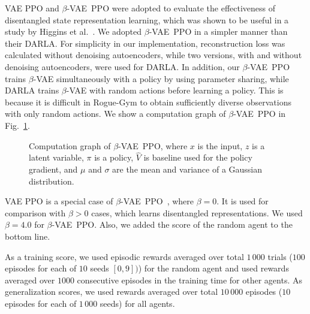 \documentclass[conference]{IEEEtran}
\newcommand\hig{Higgins et al.~\cite{DARLA}}
\newcommand\bvae{$\beta$-VAE}
\newcommand\bppo{\bvae~PPO}
\begin{document}
VAE PPO and \bppo{} were adopted to evaluate the effectiveness of
disentangled state representation learning, which was shown to be useful
in a study by \hig{}.
We adopted \bppo{} in a simpler manner than their DARLA. 
For simplicity in our implementation, reconstruction loss was calculated
without denoising autoencoders, while two versions, with and without
denoising autoencoders, were used for DARLA.
In addition, our \bppo{} trains \bvae{} simultaneously with a
policy by using parameter sharing, while DARLA trains \bvae{} with
random actions before learning a policy.
This is because it is difficult in Rogue-Gym to obtain sufficiently
diverse observations with only random actions.
We show a computation graph of \bppo{} in Fig.~\ref{proposed-graph}.
\begin{figure}[t]
 \centering
 \caption{Computation graph of \bppo{}, where $x$ is the input, $z$ is a
 latent variable, $\pi$ is a policy, $\hat{V}$ is baseline used for the
 policy gradient, and $\mu$ and $\sigma$ are the mean and variance of a
 Gaussian distribution.} \label{proposed-graph}
\end{figure}

VAE PPO is a special case of \bppo{}~\cite{betaVAE}, where $\beta=0$.
It is used for comparison with $\beta > 0$ cases, which learns
disentangled representations.
We used $\beta = 4.0$ for \bppo{}.
Also, we added the score of the random agent to the bottom line.

As a training score, we used episodic rewards averaged over total
$1\,000$ trials ($100$ episodes for each of $10$ seeds $[0, 9])$) for the
random agent and used rewards averaged over $1000$ consecutive episodes
in the training time for other agents.
As generalization scores, we used rewards averaged over total $10\,000$
episodes ($10$ episodes for each of $1\,000$ seeds) for all agents.
\end{document}
